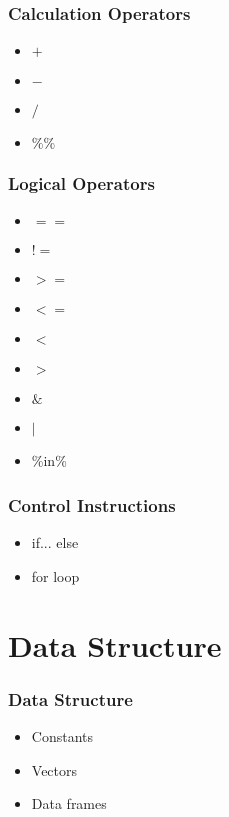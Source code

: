\documentclass{beamer}
\begin{document}
    \begin{frame}
        \frametitle{Calculation Operators}
        \begin{itemize}
            \item $+$
            \item $-$
            \item $/$
            \item $\%\%$ 
        \end{itemize}
    \end{frame}
    
    \begin{frame}
        \frametitle{Logical Operators}
        \begin{itemize}
            \item $==$
            \item $!=$
            \item $>=$
            \item $<=$
            \item $<$
            \item $>$
            \item $\&$
            \item $|$
            \item \%in\%
        \end{itemize}
    \end{frame}
    
    \begin{frame}
        \frametitle{Control Instructions}
        \begin{itemize}
            \item if... else
            \item for loop
        \end{itemize}
    \end{frame}









\section{\R {} Data Structure}

    \begin{frame}
        \frametitle{Data Structure}
        \begin{itemize}
            \item<1-> Constants
            \item<2-> Vectors
            \item<3-> Data frames
        \end{itemize}
    \end{frame}
    
\end{document}
